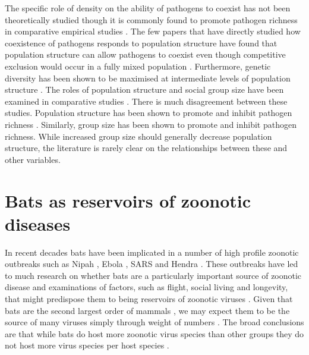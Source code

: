 The specific role of density on the ability of pathogens to coexist has not been theoretically studied though it is commonly found to promote pathogen richness in comparative empirical studies \cite{kamiya2014determines, nunn2003comparative, arneberg2002host}.
The few papers that have directly studied how coexistence of pathogens responds to population structure have found that population structure can allow pathogens to coexist even though competitive exclusion would occur in a fully mixed population \cite{qiu2013vector, allen2004sis, nunes2006localized}.
Furthermore, genetic diversity has been shown to be maximised at intermediate levels of population structure \cite{campos2006pathogen}.
The roles of population structure and social group size have been examined in comparative studies \cite{maganga2014bat, gay2014parasite, turmelle2009correlates, altizer2003social, bordes2007rodent, ezenwa2006host, rifkin2012animals, vitone2004body}.
There is much disagreement between these studies.
Population structure has been shown to promote \cite{maganga2014bat, turmelle2009correlates} and inhibit pathogen richness \cite{gay2014parasite}.
Similarly, group size has been shown to promote \cite{rifkin2012animals, bordes2007rodent} and inhibit \cite{ezenwa2006host} pathogen richness.
While increased group size should generally decrease population structure, the literature is rarely clear on the relationships between these and other variables.




\section{Bats as reservoirs of zoonotic diseases}


In recent decades bats have been implicated in a number of high profile zoonotic outbreaks such as Nipah \cite{field2001natural, halpin2011pteropid}, Ebola \cite{leroy2005fruit}, SARS \cite{li2005bats} and Hendra \cite{field2001natural}.
These outbreaks have led to much research on whether bats are a particularly important source of zoonotic disease \cite{luis2013comparison, olival2015bats, wang2011mass} and examinations of factors, such as flight, social living and longevity, that might predispose them to being reservoirs of zoonotic viruses \cite{calisher2006bats, o2014bat, dobson2005links, racey2015uniqueness, kuzmin2011bats}.
Given that bats are the second largest order of mammals \cite{wilson2005mammal}, we may expect them to be the source of many viruses simply through weight of numbers \cite{luis2013comparison}.
The broad conclusions are that while bats do host more zoonotic virus species than other groups \cite{luis2013comparison} they do not host more virus species per host species \cite{olival2015bats}.


